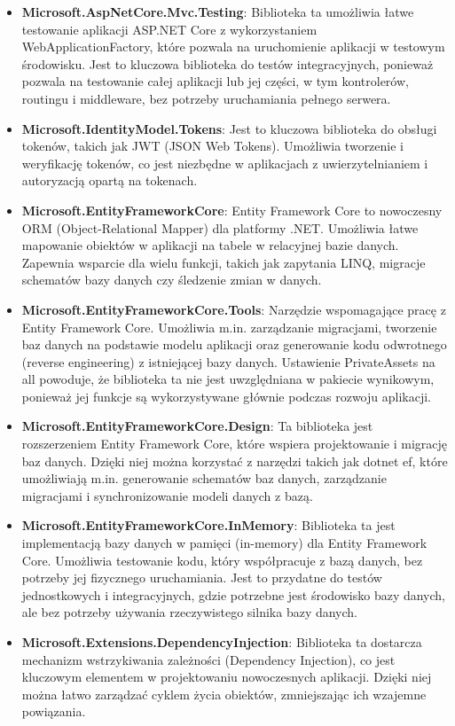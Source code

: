 \documentclass[12pt,a4paper]{article}
\begin{document}
\begin{itemize}
    \item \textbf{Microsoft.AspNetCore.Mvc.Testing}: Biblioteka ta umożliwia łatwe testowanie aplikacji ASP.NET Core z wykorzystaniem WebApplicationFactory, które pozwala na uruchomienie aplikacji w testowym środowisku. Jest to kluczowa biblioteka do testów integracyjnych, ponieważ pozwala na testowanie całej aplikacji lub jej części, w tym kontrolerów, routingu i middleware, bez potrzeby uruchamiania pełnego serwera.
    \item \textbf{Microsoft.IdentityModel.Tokens}: Jest to kluczowa biblioteka do obsługi tokenów, takich jak JWT (JSON Web Tokens). Umożliwia tworzenie i weryfikację tokenów, co jest niezbędne w aplikacjach z uwierzytelnianiem i autoryzacją opartą na tokenach.
    \item \textbf{Microsoft.EntityFrameworkCore}: Entity Framework Core to nowoczesny ORM (Object-Relational Mapper) dla platformy .NET. Umożliwia łatwe mapowanie obiektów w aplikacji na tabele w relacyjnej bazie danych. Zapewnia wsparcie dla wielu funkcji, takich jak zapytania LINQ, migracje schematów bazy danych czy śledzenie zmian w danych.
    \item \textbf{Microsoft.EntityFrameworkCore.Tools}: Narzędzie wspomagające pracę z Entity Framework Core. Umożliwia m.in. zarządzanie migracjami, tworzenie baz danych na podstawie modelu aplikacji oraz generowanie kodu odwrotnego (reverse engineering) z istniejącej bazy danych. Ustawienie PrivateAssets na all powoduje, że biblioteka ta nie jest uwzględniana w pakiecie wynikowym, ponieważ jej funkcje są wykorzystywane głównie podczas rozwoju aplikacji.
    \item \textbf{Microsoft.EntityFrameworkCore.Design}: Ta biblioteka jest rozszerzeniem Entity Framework Core, które wspiera projektowanie i migrację baz danych. Dzięki niej można korzystać z narzędzi takich jak dotnet ef, które umożliwiają m.in. generowanie schematów baz danych, zarządzanie migracjami i synchronizowanie modeli danych z bazą.
    \item \textbf{Microsoft.EntityFrameworkCore.InMemory}: Biblioteka ta jest implementacją bazy danych w pamięci (in-memory) dla Entity Framework Core. Umożliwia testowanie kodu, który współpracuje z bazą danych, bez potrzeby jej fizycznego uruchamiania. Jest to przydatne do testów jednostkowych i integracyjnych, gdzie potrzebne jest środowisko bazy danych, ale bez potrzeby używania rzeczywistego silnika bazy danych.
    \item \textbf{Microsoft.Extensions.DependencyInjection}: Biblioteka ta dostarcza mechanizm wstrzykiwania zależności (Dependency Injection), co jest kluczowym elementem w projektowaniu nowoczesnych aplikacji. Dzięki niej można łatwo zarządzać cyklem życia obiektów, zmniejszając ich wzajemne powiązania.

\end{itemize}
\end{document}
